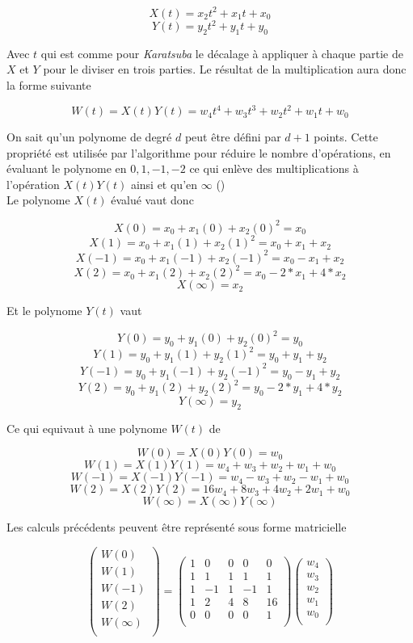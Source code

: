\documentclass[letterpaper]{article}
\begin{document}
    $$X(t) = x_2 t^2 + x_1 t + x_0$$
    $$Y(t) = y_2 t^2 + y_1 t + y_0$$

Avec $t$ qui est comme pour \emph{Karatsuba} le décalage à appliquer à chaque
partie de $X$ et $Y$ pour le diviser en trois parties.
Le résultat de la multiplication aura donc la forme suivante

    $$W(t) = X(t) Y(t) =  w_4 t^4 + w_3 t^3 + w_2 t^2 + w_1 t + w_0$$

On sait qu'un polynome de degré $d$ peut être défini par $d + 1$ points. Cette
propriété est utilisée par l'algorithme pour réduire le nombre d'opérations,
en évaluant le polynome en $0, 1, -1, -2$ ce qui enlève des multiplications
à l'opération $X(t) Y(t)$ ainsi et qu'en $\infty$ (\cite{wikitoom3})\\

Le polynome $X(t)$ évalué vaut donc

    $$X(0) = x_{0} + x_{1} (0) + x_2 {(0)}^{2} = x_{0}$$
    $$X(1) = x_0 + x_1(1) + x_2{(1)}^2 = x_0 + x_1 + x_2$$
    $$X(-1) = x_0 + x_1(-1) + x_2{(-1)}^2 = x_0 - x_1 + x_2$$
    $$X(2) = x_0 + x_1(2) + x_2{(2)}^2 = x_0 - 2 * x_1 + 4 * x_2$$
    $$X(\infty) = x_2$$

Et le polynome $Y(t)$ vaut

    $$Y(0) = y_{0} + y_{1} (0) + y_2 {(0)}^{2} = y_{0}$$
    $$Y(1) = y_0 + y_1(1) + y_2{(1)}^2 = y_0 + y_1 + y_2$$
    $$Y(-1) = y_0 + y_1(-1) + y_2{(-1)}^2 = y_0 - y_1 + y_2$$
    $$Y(2) = y_0 + y_1(2) + y_2{(2)}^2 = y_0 - 2 * y_1 + 4 * y_2$$
    $$Y(\infty) = y_2$$

Ce qui equivaut à une polynome $W(t)$ de

    $$W(0) = X(0)Y(0) = w_0$$
    $$W(1) = X(1)Y(1) = w_4 + w_3 + w_2 + w_1 + w_0$$
    $$W(-1) =X(-1)Y(-1) = w_4 - w_3 + w_2 - w_1 + w_0$$
    $$W(2) = X(2)Y(2) = 16 w_4 + 8 w_3 + 4 w_2 + 2 w_1 + w_0$$
    $$W(\infty) = X(\infty)Y(\infty)$$

Les calculs précédents peuvent être représenté sous forme matricielle

$$
\begin{pmatrix}
  W (0) \\
  W (1) \\
  W (-1) \\
  W (2) \\
  W (\infty) \\
\end{pmatrix}
 =
\begin{pmatrix}
  1 & 0 & 0 & 0 & 0 \\
  1 & 1 & 1 & 1 & 1 \\
  1 &-1 & 1 &-1 & 1 \\
  1 & 2 & 4 & 8 &16 \\
  0 & 0 & 0 & 0 & 1 \\
\end{pmatrix}
\begin{pmatrix}
  w_4 \\
  w_3 \\
  w_2 \\
  w_1 \\
  w_0 \\
\end{pmatrix}
$$
\end{document}
